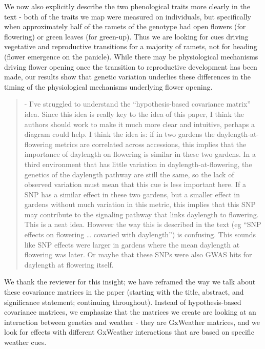 \documentclass[
  letterpaper,
  DIV=11,
  numbers=noendperiod]{scrartcl}
\begin{document}
We now also explicitly describe the two phenological traits more clearly
in the text - both of the traits we map were measured on individuals,
but specifically when approximately half of the ramets of the genotype
had open flowers (for flowering) or green leaves (for green-up). Thus we
are looking for cues driving vegetative and reproductive transitions for
a majority of ramets, not for heading (flower emergence on the panicle).
While there may be physiological mechanisms driving flower opening once
the transition to reproductive development has been made, our results
show that genetic variation underlies these differences in the timing of
the physiological mechanisms underlying flower opening.

\begin{quote}
\begin{tcolorbox}[enhanced jigsaw, rightrule=.15mm, colframe=quarto-callout-warning-color-frame, leftrule=.75mm, arc=.35mm, colback=white, opacityback=0, left=2mm, breakable, toprule=.15mm, bottomrule=.15mm]

- I've struggled to understand the ``hypothesis-based covariance
matrix'' idea. Since this idea is really key to the idea of this paper,
I think the authors should work to make it much more clear and
intuitive, perhaps a diagram could help. I think the idea is: if in two
gardens the daylength-at-flowering metrics are correlated across
accessions, this implies that the importance of daylength on flowering
is similar in these two gardens. In a third environment that has little
variation in daylength-at-flowering, the genetics of the daylength
pathway are still the same, so the lack of observed variation must mean
that this cue is less important here. If a SNP has a similar effect in
these two gardens, but a smaller effect in gardens without much
variation in this metric, this implies that this SNP may contribute to
the signaling pathway that links daylength to flowering. This is a neat
idea. However the way this is described in the text (eg ``SNP effects on
flowering \ldots{} covaried with daylength'') is confusing. This sounds
like SNP effects were larger in gardens where the mean daylength at
flowering was later. Or maybe that these SNPs were also GWAS hits for
daylength at flowering itself.

\end{tcolorbox}
\end{quote}

We thank the reviewer for this insight; we have reframed the way we talk
about these covariance matrices in the paper (starting with the title,
abstract, and significance statement; continuing throughout). Instead of
hypothesis-based covariance matrices, we emphasize that the matrices we
create are looking at an interaction between genetics and weather - they
are GxWeather matrices, and we look for effects with different GxWeather
interactions that are based on specific weather cues.
\end{document}
